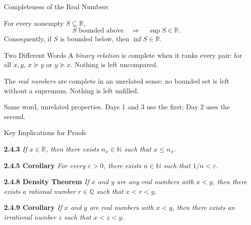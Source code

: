 \documentclass[11pt,aspectratio=169,c]{beamer}
\begin{document}
\begin{frame}{Completeness of the Real Numbers}
\begin{theorembox}
For every nonempty $S\subseteq\mathbb{R}$,
\[
S\text{ bounded above}
\quad\Longrightarrow\quad
\sup S\in\mathbb{R}.
\]
Consequently, if $S$ is bounded below, then $\inf S\in\mathbb{R}$.
\end{theorembox}

\begin{block}{Two Different Words}
A \emph{binary relation} is complete when it ranks every pair: for all $x,y$,
$x\succeq y$ or $y\succeq x$. Nothing is left uncompared.

The \emph{real numbers} are complete in an unrelated sense: no bounded set is left
without a supremum. Nothing is left unfilled.
\end{block}

\centering Same word, unrelated properties. Days 1 and 3 use the first; Day 2 uses
the second.
\end{frame}

\begin{frame}{Key Implications for Proofs}
\small
\begin{theorembox}
\textbf{2.4.3}\quad
\emph{If $x\in\mathbb{R}$, then there exists $n_x\in\mathbb{N}$ such that $x\leq n_x$.}

\vspace{.25em}
\textbf{2.4.5 Corollary}\quad
\emph{For every $\varepsilon>0$, there exists $n\in\mathbb{N}$ such that $1/n<\varepsilon$.}
\end{theorembox}

\begin{theorembox}
\textbf{2.4.8 Density Theorem}\quad
\emph{If $x$ and $y$ are any real numbers with $x<y$, then there exists a rational number
$r\in\mathbb{Q}$ such that $x<r<y$.}

\vspace{.25em}
\textbf{2.4.9 Corollary}\quad
\emph{If $x$ and $y$ are real numbers with $x<y$, then there exists an irrational number
$z$ such that $x<z<y$.}
\end{theorembox}
\end{frame}
\end{document}
